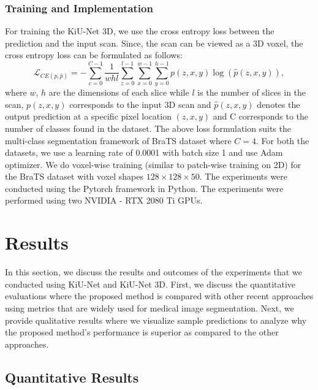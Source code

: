 \documentclass[journal,twoside,web]{ieeecolor}
\begin{document}
\subsubsection{Training and Implementation}

For training the KiU-Net 3D, we use the cross entropy loss  between the prediction and the input scan. Since, the scan can be viewed as a 3D voxel,  the cross entropy loss can be formulated as follows:
\setlength{\belowdisplayskip}{2pt} \setlength{\belowdisplayshortskip}{2pt}
\setlength{\abovedisplayskip}{2pt} \setlength{\abovedisplayshortskip}{2pt}
\[\mathcal{L}_{CE(p,\hat{p})} = - \sum_{c=0}^{C-1} \frac{1}{whl} \sum_{z=0}^{l-1} \sum_{x=0}^{w-1}\sum_{y=0}^{h-1}p(z,x,y) \log(\hat{p}(z,x,y) ),\]
where $w$, $h$ are the dimensions of each slice while $l$ is the number of slices in the scan, $p(z,x,y)$ corresponds to the input 3D scan and  $\hat{p}(z,x,y)$ denotes the output prediction at a specific pixel location $(z,x,y)$ and  C corresponds to the number of classes found in the dataset. The above loss formulation suits the multi-class segmentation framework of BraTS dataset where $C=4$. For both the datasets, we use a learning rate of 0.0001 with batch size 1 and use Adam optimizer. We do voxel-wise training (similar to patch-wise training on 2D) for the BraTS dataset with voxel shapes $128 \times 128 \times 50$. The experiments were conducted using the Pytorch framework in Python. The experiments were performed using two NVIDIA - RTX 2080 Ti GPUs.   





\section{Results}

In this section, we discuss the results and outcomes of the experiments that we conducted using KiU-Net and KiU-Net 3D. First, we discuss the quantitative evaluations where  the proposed method is compared with other recent approaches using    metrics that are widely used for medical image segmentation. Next, we provide qualitative results where we  visualize sample predictions to analyze why the proposed  method's  performance is superior as compared to  the other approaches.

\subsection{Quantitative Results}
\end{document}

